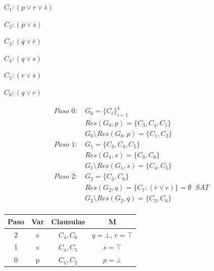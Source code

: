 \documentclass[12pt, twoside, openright]{report} %
\begin{document}
\begin{multicols}{2}

	$C_{1}:(p \vee r \vee \bar{s})$

	$C_{2}:(\bar{p} \vee \bar{s})$

	$C_{3}:(\bar{q} \vee \bar{r})$

	$C_{4}:(q \vee s)$

	$C_{5}:(r \vee \bar{s})$

	$C_{6}: (q \vee r)$

	\columnbreak

	\begin{align*}
		\textit{Paso 0: } & G_0 = \{C_i\}_{i=1}^4                                                   \\
		                  & Res(G_0, p) = \{ C_3, C_4, C_5 \}                                       \\
		                  & G_0 \setminus Res(G_0, p) = \{ C_1, C_2 \}                              \\
		\textit{Paso 1: } & G_1 = \{ C_3, C_4, C_5 \}                                               \\
		                  & Res(G_1, s) = \{ C_3, C_6 \}                                            \\
		                  & G_1 \setminus Res(G_1, s) = \{ C_4, C_5 \}                              \\
		\textit{Paso 2: } & G_2 = \{C_3, C_6 \}                                                     \\
		                  & Res(G_2, q) = \{ C_7:(\bar{r} \vee r) \} = \emptyset \; \; \textit{SAT} \\
		                  & G_2 \setminus Res(G_2, q) = \{ C_3, C_6 \}                              \\
	\end{align*}

\end{multicols}

\begin{table}[H]
	\centering
	\begin{tabular}{c|c|c|c}
		\textbf{Paso}           & \textbf{Var} & \textbf{Clausulas} & \textbf{M}                              \\ \hline
		\multicolumn{1}{|c|}{2} & s            & $C_4, C_6$         & \multicolumn{1}{c|}{$q=\bot$, $r=\top$} \\ \hline
		\multicolumn{1}{|c|}{1} & s            & $C_4, C_5$         & \multicolumn{1}{c|}{$s=\top$}           \\ \hline
		\multicolumn{1}{|c|}{0} & p            & $C_1, C_2$         & \multicolumn{1}{c|}{$p=\bot$}           \\ \hline
	\end{tabular}
\end{table}
\end{document}
